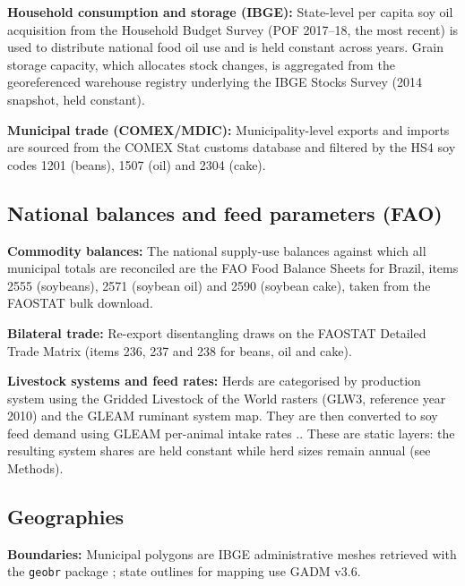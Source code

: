\textbf{Household consumption and storage (IBGE):} State-level per capita soy oil acquisition from the Household Budget Survey (POF 2017–18, the most recent) is used to distribute national food oil use and is held constant across years. Grain storage capacity, which allocates stock changes, is aggregated from the georeferenced warehouse registry underlying the IBGE Stocks Survey (2014 snapshot, held constant).

\textbf{Municipal trade (COMEX/MDIC):} Municipality-level exports and imports are sourced from the COMEX Stat customs database and filtered by the HS4 soy codes 1201 (beans), 1507 (oil) and 2304 (cake).

\subsection{National balances and feed parameters (FAO)}\label{subsec:fao}

\textbf{Commodity balances:} The national supply-use balances against which all municipal totals are reconciled are the FAO Food Balance Sheets for Brazil, items 2555 (soybeans), 2571 (soybean oil) and 2590 (soybean cake), taken from the FAOSTAT bulk download.

\textbf{Bilateral trade:} Re-export disentangling draws on the FAOSTAT
Detailed Trade Matrix (items 236, 237 and 238 for beans, oil and cake).

\textbf{Livestock systems and feed rates:} Herds are categorised by production system using the Gridded Livestock of the World rasters (GLW3, reference year 2010) \cite{gilbert2018glw} and the GLEAM ruminant system map. They are then converted to soy feed demand using GLEAM per-animal intake rates \cite{fao2018gleam}.. These are static layers: the resulting system shares are held constant while herd sizes remain annual (see Methods).

\subsection{Geographies}\label{subsec:geo}

\textbf{Boundaries:} Municipal polygons are IBGE administrative meshes
retrieved with the \texttt{geobr} package \cite{pereira2019geobr}; state
outlines for mapping use GADM v3.6.

